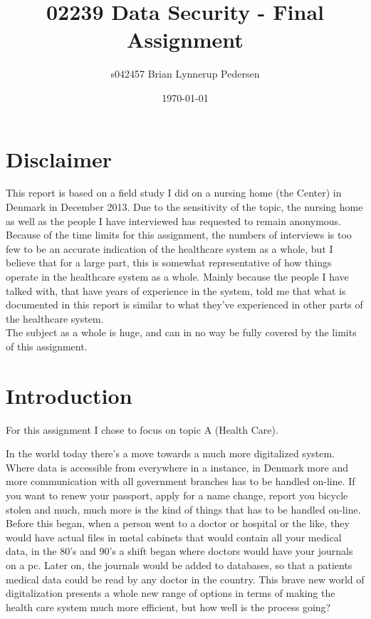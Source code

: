 \documentclass[11pt]{article}
\begin{document}
\title{02239 Data Security - Final Assignment}
\author{s042457 Brian Lynnerup Pedersen}
\date{\today}
\maketitle
\pagebreak
\tableofcontents
\pagebreak
\section{Disclaimer}
This report is based on a field study I did on a nursing home (the Center) in Denmark in December 2013. Due to the sensitivity of the topic, the nursing home as well as the people I have interviewed has requested to remain anonymous.
Because of the time limits for this assignment, the numbers of interviews is too few to be an accurate indication of the healthcare system as a whole, but I  believe that for a large part, this is somewhat representative of how things operate in the healthcare system as a whole. Mainly because the people I have talked with, that have years of experience in the system, told me that what is documented in this report is similar to what they've experienced in other parts of the healthcare system.\\
The subject as a whole is huge, and can in no way be fully covered by the limits of this assignment.
\pagebreak
\section{Introduction}
For this assignment I chose to focus on topic A (Health Care).

In the world today there's a move towards a much more digitalized system. Where data is accessible from everywhere in a instance, in Denmark more and more communication with all government branches has to be handled on-line. If you want to renew your passport, apply for a name change, report you bicycle stolen and much, much more is the kind of things that has to be handled on-line. Before this began, when a person went to a doctor or hospital or the like, they would have actual files in metal cabinets that would contain all your medical data, in the 80's and 90's a shift began where doctors would have your journals on a pc. Later on, the journals would be added to databases, so that a patients medical data could be read by any doctor in the country. This brave new world of digitalization presents a whole new range of options in terms of making the health care system much more efficient, but how well is the process going?
\end{document}
